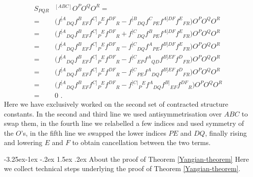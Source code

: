 \documentclass[12pt]{article}
\makeatletter
\renewcommand\subsection{\@startsection{subsection}{2}{\z@}%
                                     {-3.25ex\@plus -1ex \@minus -.2ex}%
                                     {1.5ex \@plus .2ex}%
                                     {\normalfont\bfseries}}
\numberwithin{equation}{section}
\makeatother
\begin{document}
\begin{equation}\label{T-contraction-antisymmetrisation}
\begin{aligned}
S_{PQR}&{}^{[ABC]}O^{P}O^{Q}O^{R}=
\\
=&\bigl(f^{[A}{}_{DQ}f^{B}{}_{EF}f^{C]}{}_{P}{}^{E}f^{DF}{}_{R}-f^{[B}{}_{DQ}f^{C}{}_{PE}f^{A]DF}f^{E}{}_{FR} \bigr)O^{P}O^{Q}O^{R}
\\
=&\bigl(f^{[A}{}_{DQ}f^{B}{}_{EF}f^{C]}{}_{P}{}^{E}f^{DF}{}_{R}+f^{[C}{}_{DQ}f^{B}{}_{PE}f^{A]DF}f^{E}{}_{FR} \bigr)O^{P}O^{Q}O^{R}
\\
=&\bigl(f^{[A}{}_{DQ}f^{B}{}_{EF}f^{C]}{}_{P}{}^{E}f^{DF}{}_{R}-f^{[C}{}_{DQ}f^{A}{}_{PE}f^{B]DF}f^{E}{}_{FR} \bigr)O^{P}O^{Q}O^{R}
\\
=&\bigl(f^{[A}{}_{DQ}f^{B}{}_{EF}f^{C]}{}_{P}{}^{E}f^{DF}{}_{R}-f^{[C}{}_{EP}f^{A}{}_{QD}f^{B]EF}f^{D}{}_{FR} \bigr)O^{P}O^{Q}O^{R}
\\
=&\bigl(f^{[A}{}_{DQ}f^{B}{}_{EF}f^{C]}{}_{P}{}^{E}f^{DF}{}_{R}-f^{[C}{}_{PE}f^{A}{}_{DQ}f^{B]EF}f^{D}{}_{FR} \bigr)O^{P}O^{Q}O^{R}
\\
=&\bigl(f^{[A}{}_{DQ}f^{B}{}_{EF}f^{C]}{}_{P}{}^{E}f^{DF}{}_{R}-f^{[C|}{}_{P}{}^{E}f^{A}{}_{DQ}f^{B]}{}_{EF}f^{DF}{}_{R} \bigr)O^{P}O^{Q}O^{R}
\\
=& 0 \,\, .
\end{aligned}
\end{equation}
Here we have exclusively worked on the second set of contracted structure constants. In the second and third line we used antisymmetrisation over $ABC$ to swap them, in the fourth line we relabelled a few indices and used symmetry of the $O$'s, in the fifth line we swapped the lower indices $PE$ and $DQ$, finally rising and lowering $E$ and $F$ to obtain cancellation between the two terms.



\subsection{About the proof of Theorem \ref{Yangian-theorem}}
Here we collect technical steps underlying the proof of Theorem \ref{Yangian-theorem}.
\end{document}
